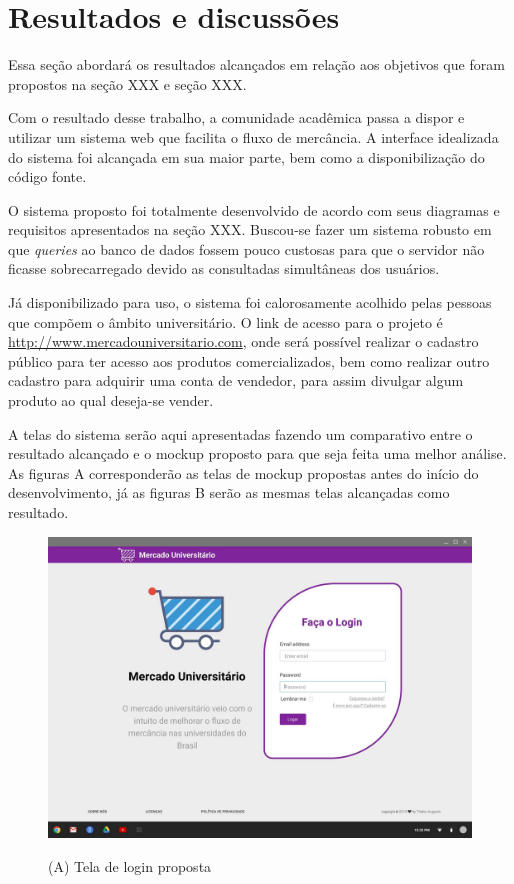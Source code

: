 \chapter{Resultados e discussões}
\label{chap:resultados}

Essa seção abordará os resultados alcançados em relação aos objetivos que foram propostos na seção XXX e seção XXX.

Com o resultado desse trabalho, a comunidade acadêmica passa a dispor e utilizar um sistema web que facilita o fluxo de mercância. A interface idealizada do sistema foi alcançada em sua maior parte, bem como a disponibilização do código fonte.

O sistema proposto foi totalmente desenvolvido de acordo com seus diagramas e requisitos apresentados na seção XXX. Buscou-se fazer um sistema robusto em que \textit{queries} ao banco de dados fossem pouco custosas para que o servidor não ficasse sobrecarregado devido as consultadas simultâneas dos usuários.

Já disponibilizado para uso, o sistema foi calorosamente acolhido pelas pessoas que compõem o âmbito universitário. O link de acesso para o projeto é \url{http://www.mercadouniversitario.com}, onde será possível realizar o cadastro público para ter acesso aos produtos comercializados, bem como realizar outro cadastro para adquirir uma conta de vendedor, para assim divulgar algum produto ao qual deseja-se vender.

A telas do sistema serão aqui apresentadas fazendo um comparativo entre o resultado alcançado e o mockup proposto para que seja feita uma melhor análise. As figuras A corresponderão as telas de mockup propostas antes do início do desenvolvimento, já as figuras B serão as mesmas telas alcançadas como resultado.

\begin{figure}[htbp!]
  \centering
  \caption{(A) Tela de login proposta}
  \includegraphics[width=1\textwidth]{figs/mockup/login.jpg}
    \label{fig:err}
\end{figure}

